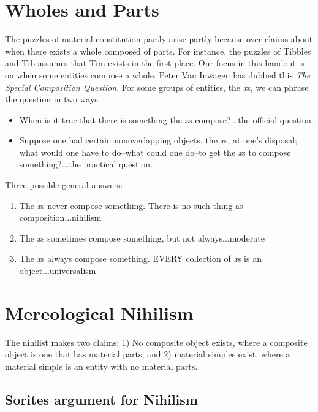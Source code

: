 \documentclass[oneside]{article}
\begin{document}
\thispagestyle{fancy}

\section*{Wholes and Parts}
The puzzles of material constitution partly arise partly because over claims about when there exists a whole composed of parts. For instance, the puzzles of Tibbles and Tib assumes that Tim exists in the first place. Our focus in this handout is on when some entities compose a whole. Peter Van Inwagen has dubbed this \emph{The Special Composition Question}. For some groups of entities, the \emph{x}s, we can phrase the question in two ways: 
\begin{itemize}
\item When is it true that there is something the \emph{x}s compose?...the official question.
\item Suppose one had certain nonoverlapping objects, the \emph{x}s, at one’s disposal; what would one
have to do--what could one do--to get the \emph{x}s to compose something?...the practical question.
\end{itemize}

Three possible general answers: 

\begin{enumerate}

\item The \emph{x}s never compose something. There is no such thing as composition...nihilism
\item The \emph{x}s sometimes compose something, but not always...moderate
\item The \emph{x}s always compose something. EVERY collection of \emph{x}s is an object...universalism
\end{enumerate}



\section*{Mereological Nihilism}
The nihilist makes two claims: 1) No composite object exists, where a composite object is one that has material parts, and 2) material simples exist, where a material simple is an entity with no material parts.


\subsection*{Sorites argument for Nihilism} 
\end{document}
